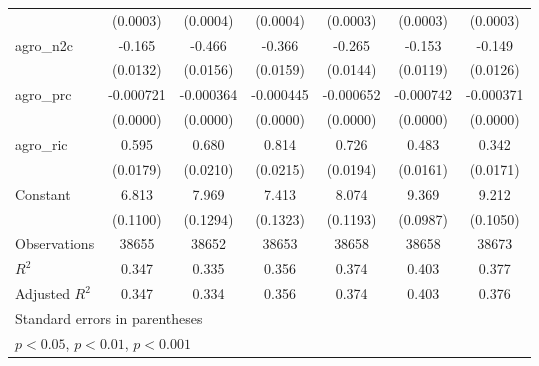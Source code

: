 {\begin{tabular}{l*{6}{c}}
                    &    (0.0003)         &    (0.0004)         &    (0.0004)         &    (0.0003)         &    (0.0003)         &    (0.0003)         \\
\addlinespace
agro\_n2c            &      -0.165\sym{***}&      -0.466\sym{***}&      -0.366\sym{***}&      -0.265\sym{***}&      -0.153\sym{***}&      -0.149\sym{***}\\
                    &    (0.0132)         &    (0.0156)         &    (0.0159)         &    (0.0144)         &    (0.0119)         &    (0.0126)         \\
\addlinespace
agro\_prc            &   -0.000721\sym{***}&   -0.000364\sym{***}&   -0.000445\sym{***}&   -0.000652\sym{***}&   -0.000742\sym{***}&   -0.000371\sym{***}\\
                    &    (0.0000)         &    (0.0000)         &    (0.0000)         &    (0.0000)         &    (0.0000)         &    (0.0000)         \\
\addlinespace
agro\_ric            &       0.595\sym{***}&       0.680\sym{***}&       0.814\sym{***}&       0.726\sym{***}&       0.483\sym{***}&       0.342\sym{***}\\
                    &    (0.0179)         &    (0.0210)         &    (0.0215)         &    (0.0194)         &    (0.0161)         &    (0.0171)         \\
\addlinespace
Constant            &       6.813\sym{***}&       7.969\sym{***}&       7.413\sym{***}&       8.074\sym{***}&       9.369\sym{***}&       9.212\sym{***}\\
                    &    (0.1100)         &    (0.1294)         &    (0.1323)         &    (0.1193)         &    (0.0987)         &    (0.1050)         \\
\midrule
Observations        &       38655         &       38652         &       38653         &       38658         &       38658         &       38673         \\
\(R^{2}\)           &       0.347         &       0.335         &       0.356         &       0.374         &       0.403         &       0.377         \\
Adjusted \(R^{2}\)  &       0.347         &       0.334         &       0.356         &       0.374         &       0.403         &       0.376         \\
\bottomrule
\multicolumn{7}{l}{\footnotesize Standard errors in parentheses}\\
\multicolumn{7}{l}{\footnotesize \sym{*} \(p<0.05\), \sym{**} \(p<0.01\), \sym{***} \(p<0.001\)}\\
\end{tabular}
}
